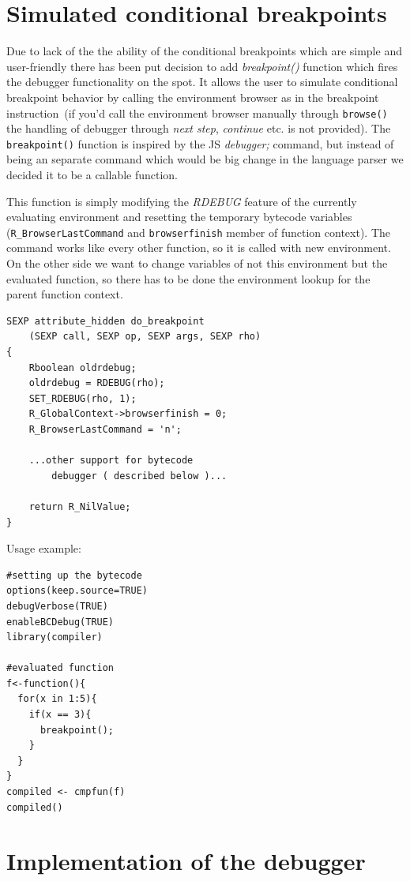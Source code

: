 \documentclass[thesis=M,english]{FITthesis}[2018/10/20]
\newcommand{\code}[1]{\texttt{#1}}
\begin{document}
\section{Simulated conditional breakpoints}\label{conditional-breakpoints}

Due to lack of the the ability of the conditional breakpoints which are simple and user-friendly there has been put decision to add \textit{breakpoint()} function which fires the debugger functionality on the spot. It allows the user to simulate conditional breakpoint behavior by calling the environment browser as in the breakpoint instruction~(if you'd call the environment browser manually through \code{browse()} the handling of debugger through \textit{next step}, \textit{continue} etc. is not provided). The \code{breakpoint()} function is inspired by the JS \textit{debugger;} command, but instead of being an separate command which would be big change in the language parser we decided it to be a callable function.

This function is simply modifying the \textit{RDEBUG} feature of the currently evaluating environment and resetting the temporary bytecode variables (\code{R{\_}BrowserLastCommand} and \code{browserfinish} member of function context). The command works like every other function, so it is called with new environment. On the other side we want to change variables of not this environment but the evaluated function, so there has to be done the environment lookup for the parent function context.

\begin{lstlisting}
SEXP attribute_hidden do_breakpoint
	(SEXP call, SEXP op, SEXP args, SEXP rho)
{
    Rboolean oldrdebug;
    oldrdebug = RDEBUG(rho);
    SET_RDEBUG(rho, 1);
    R_GlobalContext->browserfinish = 0;
    R_BrowserLastCommand = 'n';

	...other support for bytecode 
		debugger ( described below )...

    return R_NilValue;
}
\end{lstlisting}

Usage example:
\begin{lstlisting}
#setting up the bytecode
options(keep.source=TRUE)
debugVerbose(TRUE)
enableBCDebug(TRUE)
library(compiler)

#evaluated function
f<-function(){
  for(x in 1:5){
    if(x == 3){
	  breakpoint();
	}
  }
}
compiled <- cmpfun(f)
compiled()
\end{lstlisting}


\section{Implementation of the debugger}\label{implementation-of-debugger}
\end{document}

